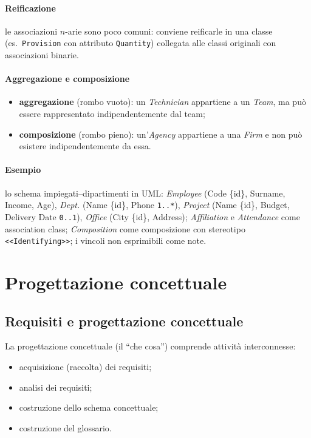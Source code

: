 \documentclass[a4paper,12pt]{article}
\begin{document}
\paragraph{Reificazione} le associazioni $n$-arie sono poco comuni: conviene
reificarle in una classe (es.\ \texttt{Provision} con attributo
\texttt{Quantity}) collegata alle classi originali con associazioni binarie.

\paragraph{Aggregazione e composizione}
\begin{itemize}
  \item \textbf{aggregazione} (rombo vuoto): un \emph{Technician} appartiene a
    un \emph{Team}, ma può essere rappresentato indipendentemente dal team;
  \item \textbf{composizione} (rombo pieno): un'\emph{Agency} appartiene a una
    \emph{Firm} e non può esistere indipendentemente da essa.
\end{itemize}

\paragraph{Esempio} lo schema impiegati--dipartimenti in UML: \emph{Employee}
(Code \{id\}, Surname, Income, Age), \emph{Dept.} (Name \{id\}, Phone
\texttt{1..*}), \emph{Project} (Name \{id\}, Budget, Delivery Date
\texttt{0..1}), \emph{Office} (City \{id\}, Address); \emph{Affiliation} e
\emph{Attendance} come association class; \emph{Composition} come
composizione con stereotipo \texttt{<<Identifying>>}; i vincoli non esprimibili
come note.

\section{Progettazione concettuale}

\subsection{Requisiti e progettazione concettuale}

La progettazione concettuale (il ``che cosa'') comprende attività
interconnesse:
\begin{itemize}
  \item acquisizione (raccolta) dei requisiti;
  \item analisi dei requisiti;
  \item costruzione dello schema concettuale;
  \item costruzione del glossario.
\end{itemize}
\end{document}
